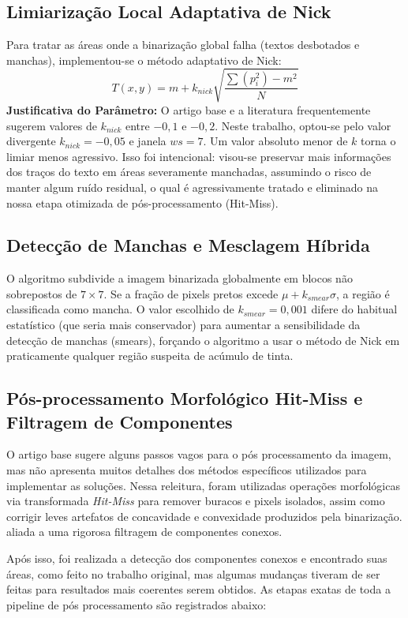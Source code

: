 \documentclass[conference]{IEEEtran}
\begin{document}
\subsection{Limiarização Local Adaptativa de Nick}
Para tratar as áreas onde a binarização global falha (textos desbotados e manchas), implementou-se o método adaptativo de Nick:
\begin{equation}
T(x,y) = m + k_{nick} \sqrt{\frac{\sum (p_i^2) - m^2}{N}}
\end{equation}
\textbf{Justificativa do Parâmetro:} O artigo base e a literatura frequentemente sugerem valores de $k_{nick}$ entre $-0,1$ e $-0,2$. Neste trabalho, optou-se pelo valor divergente $k_{nick} = -0,05$ e janela $ws = 7$. Um valor absoluto menor de $k$ torna o limiar menos agressivo. Isso foi intencional: visou-se preservar mais informações dos traços do texto em áreas severamente manchadas, assumindo o risco de manter algum ruído residual, o qual é agressivamente tratado e eliminado na nossa etapa otimizada de pós-processamento (Hit-Miss).

\subsection{Detecção de Manchas e Mesclagem Híbrida}
O algoritmo subdivide a imagem binarizada globalmente em blocos não sobrepostos de $7\times7$. Se a fração de pixels pretos excede $\mu + k_{smear}\sigma$, a região é classificada como mancha. O valor escolhido de $k_{smear} = 0,001$ difere do habitual estatístico (que seria mais conservador) para aumentar a sensibilidade da detecção de manchas (smears), forçando o algoritmo a usar o método de Nick em praticamente qualquer região suspeita de acúmulo de tinta.

\subsection{Pós-processamento Morfológico Hit-Miss e Filtragem de Componentes}
O artigo base sugere alguns passos vagos para o pós processamento da imagem, mas não apresenta muitos detalhes dos métodos específicos utilizados para implementar as soluções. Nessa releitura, foram utilizadas operações morfológicas via transformada \textit{Hit-Miss} para remover buracos e pixels isolados, assim como corrigir leves artefatos de concavidade e convexidade produzidos pela binarização. aliada a uma rigorosa filtragem de componentes conexos. 

Após isso, foi realizada a detecção dos componentes conexos e encontrado suas áreas, como feito no trabalho original, mas algumas mudanças tiveram de ser feitas para resultados mais coerentes serem obtidos. As etapas exatas de toda a pipeline de pós processamento são registrados abaixo:
\end{document}
